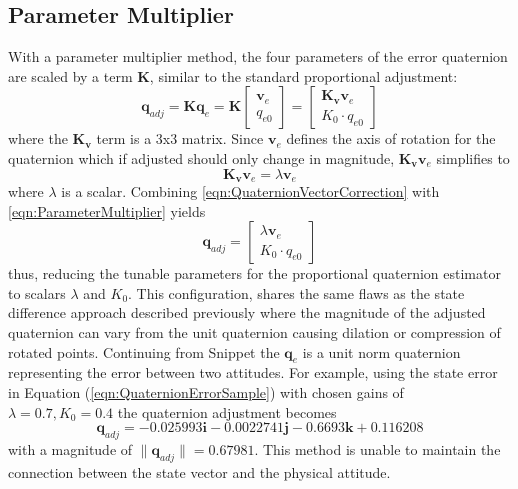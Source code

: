 \documentclass[]{aiaa-tc}%
\newcommand{\bs}[1]{\boldsymbol{#1}}
\begin{document}
\subsection{Parameter Multiplier}
\label{subsec:ParameterMultiplier}

With a parameter multiplier method, the four parameters of the error quaternion are scaled by a term $\bs{K}$, similar to the standard proportional adjustment:
\begin{equation}
  \bs{q}_{adj} = \bs{K} \bs{q}_e
    = \bs{K} \begin{bmatrix} \bs{v}_e \\ q_{e0} \end{bmatrix}
    = \begin{bmatrix} \bs{K_{v}}\bs{v}_e \\ K_{0} \cdot q_{e0} \end{bmatrix}
  \label{eqn:ParameterMultiplier}
\end{equation}
where the $\bs{K_{v}}$ term is a 3x3 matrix.  Since $\bs{v}_e$ defines the axis of rotation for the quaternion which if adjusted should only change in magnitude, $\bs{K_{v}}\bs{v}_e$ simplifies to
\begin{equation}
  \bs{K_{v}} \bs{v}_e = \lambda \bs{v}_e
  \label{eqn:QuaternionVectorCorrection}
\end{equation}
where $\lambda$ is a scalar.
Combining \ref{eqn:QuaternionVectorCorrection} with \ref{eqn:ParameterMultiplier} yields
\begin{equation}
  \bs{q}_{adj} = \begin{bmatrix} \lambda \bs{v}_e \\ K_{0} \cdot q_{e0} \end{bmatrix}
  \label{eqn:QuaternionScalarMultiplier}
\end{equation}
thus, reducing the tunable parameters for the proportional quaternion estimator to scalars $\lambda$ and $K_{0}$.  This configuration, shares the same flaws as the state difference approach described previously where the magnitude of the adjusted quaternion can vary from the unit quaternion causing dilation or compression of rotated points.  Continuing from Snippet  the $\bs{q}_e$ is a unit norm quaternion representing the error between two attitudes.  For example, using the state error in Equation (\ref{eqn:QuaternionErrorSample}) with chosen gains of $\lambda = 0.7, K_{0} = 0.4$ the quaternion adjustment becomes
\begin{equation}
  \bs{q}_{adj} = -0.025993 \bs{i} -0.0022741 \bs{j} -0.6693 \bs{k} +0.116208
\end{equation}
with a magnitude of $\| \bs{q}_{adj} \| = 0.67981$.  This method is unable to maintain the connection between the state vector and the physical attitude.
\end{document}
